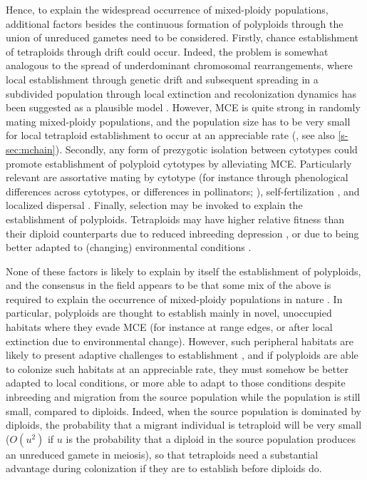 \documentclass[12pt,a4paper]{article}
\begin{document}
Hence, to explain the widespread occurrence of mixed-ploidy populations,
additional factors besides the continuous formation of polyploids through the
union of unreduced gametes need to be considered.
Firstly, chance establishment of tetraploids through drift could occur.
Indeed, the problem is somewhat analogous to the spread of underdominant
chromosomal rearrangements, where local establishment through genetic drift and
subsequent spreading in a subdivided population through local extinction and 
recolonization dynamics has been suggested as a plausible model
\citep{lande1985}.
However, MCE is quite strong in randomly mating mixed-ploidy populations, and
the population size has to be very small for local tetraploid establishment to
occur at an appreciable rate (\cite{rausch2005}, see also \cref{s-sec:mchain}).
Secondly, any form of prezygotic isolation between cytotypes could
promote establishment of polyploid cytotypes by alleviating MCE.
Particularly relevant are assortative mating by cytotype  (for instance through
phenological differences across cytotypes, or differences in pollinators;
\cite{kolar2017}), self-fertilization \citep{rausch2005,novikova2023}, and
localized dispersal \citep{baack2005,kolar2017}.
Finally, selection may be invoked to explain the establishment of polyploids.
Tetraploids may have higher relative fitness than their diploid counterparts
due to reduced inbreeding depression \citep{ronfort1999}, or due to being
better adapted to (changing) environmental conditions \citep{vandepeer2021}. 

None of these factors is likely to explain by itself the establishment of
polyploids, and the consensus in the field appears to be that some mix of the
above is required to explain the occurrence of mixed-ploidy populations in
nature \citep{kolar2017,mortier2024}.
In particular, polyploids are thought to establish mainly in novel, unoccupied
habitats where they evade MCE (for instance at range edges, or after local
extinction due to environmental change).
However, such peripheral habitats are likely to present adaptive challenges to
establishment \citep{kawecki2008}, and if polyploids are able to colonize such
habitats at an appreciable rate, they must somehow be better adapted to local
conditions, or more able to adapt to those conditions despite inbreeding and
migration from the source population while the population is still small,
compared to diploids.
Indeed, when the source population is dominated by diploids, the probability
that a migrant individual is tetraploid will be very small ($O(u^2)$ if $u$ is
the probability that a diploid in the source population produces an unreduced
gamete in meiosis), so that tetraploids need a substantial advantage during
colonization if they are to establish before diploids do.
\end{document}
